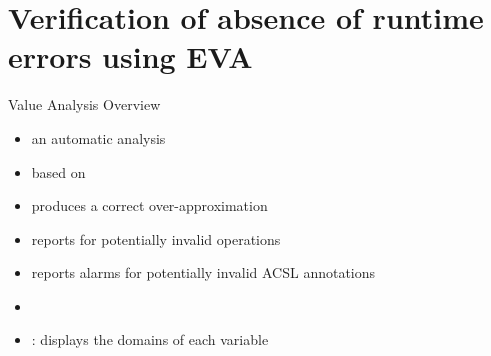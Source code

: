 \section{Verification of absence of runtime errors using EVA}


\begin{frame}{Value Analysis Overview}

\begin{center}
  \large{}
\end{center}

\begin{itemize}
\item an automatic analysis	
\smallskip	
\item based on 
\smallskip
\item produces a correct over-approximation
\smallskip
\item reports  for potentially invalid operations
\smallskip
\item reports alarms for potentially invalid ACSL annotations
\smallskip
\item {}
\smallskip
\item {}:
  displays the domains of each variable %
\end{itemize}

\end{frame}




